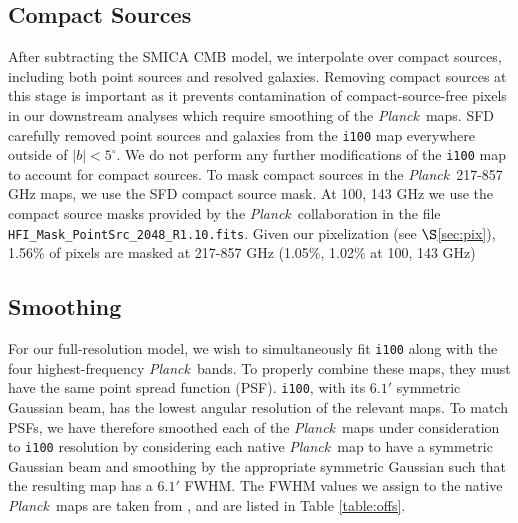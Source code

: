 \documentclass{emulateapj}
\newcommand{\PLANCK}{{\it Planck}}
\begin{document}

\subsection{Compact Sources}
\label{sec:ptsrc}
After subtracting the SMICA CMB model, we interpolate over compact sources, 
including both point sources and resolved galaxies. Removing compact sources at
this stage is important as it prevents contamination of compact-source-free 
pixels in our downstream analyses which require smoothing of the \PLANCK~maps. 
SFD carefully removed point sources and galaxies from the \verb|i100| map 
everywhere outside of $|b|$$<$$5^{\circ}$. We do not perform any further 
modifications of the \verb|i100| map to account for compact sources. To mask 
compact sources in the \PLANCK~217-857 GHz maps, we use the SFD compact source 
mask. At 100, 143 GHz we use the compact source masks provided by the 
\PLANCK~collaboration in the file \verb|HFI_Mask_PointSrc_2048_R1.10.fits|. 
Given our pixelization (see $\S$\ref{sec:pix}), 1.56\% of pixels are masked 
at 217-857 GHz (1.05\%, 1.02\% at 100, 143 GHz) 


\subsection{Smoothing}
\label{sec:smth}
For our full-resolution model, we wish to simultaneously fit \verb|i100| along 
with the four highest-frequency \PLANCK~bands. To properly combine these maps, 
they must have the same point spread function (PSF). \verb|i100|, with its 
$6.1'$ symmetric Gaussian beam, has the lowest angular resolution of the 
relevant maps. To match PSFs, we have therefore smoothed each of the 
\PLANCK~maps under consideration to \verb|i100| resolution by considering each 
native \PLANCK~map to have a symmetric Gaussian beam and smoothing by the 
appropriate symmetric Gaussian such that the resulting map has a  $6.1'$ FWHM. 
The FWHM values we assign to the native \PLANCK~maps are taken from 
\cite{planckbeam}, and are listed in Table \ref{table:offs}.
\end{document}
